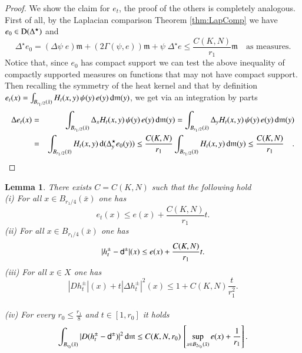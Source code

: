 \documentclass[11pt,reqno]{amsart}
\newcommand{\dom}{\rm D}
\newcommand{\mm}{\mathfrak m}
\newcommand{\sfd}{{\sf d}}
\renewcommand{\d}{{\rm{d}}}
\newtheorem{lemma}[theorem]{Lemma}
\theoremstyle{definition}
\theoremstyle{remark}
\theoremstyle{remark}
\theoremstyle{remark}
\theoremstyle{remark}
\theoremstyle{remark}
\theoremstyle{remark}
\theoremstyle{remark}
\begin{document}
\begin{proof}
We show the claim for $e_t$, the proof of the others is completely analogous. First of all,  by the Laplacian comparison Theorem  \ref{thm:LapComp} we have  $e_0\in \dom(\Delta^\star)$ and
$$\Delta^\star e_0= \left(\Delta \psi\; e \right) \mm+ \left( 2 \Gamma(\psi,e ) \right) \mm + \psi \; \Delta^\star e \leq \frac{C(K,N)}{r_{1}} \mm \quad\text{as measures}.$$
Notice that, since $e_0$ has compact support we can test the above inequality of compactly supported measures on functions that may not have compact support.  Then recalling the symmetry of the heat kernel and that by definition $e_t(x)=\int_{B_{r_{1}/2}(\bar{x})} H_t(x,y) \, \psi(y) \, e(y) \, \d\mm(y)$, we get via an integration by parts
\begin{eqnarray}
\Delta e_t (x) &=& \int_{B_{r_{1}/2}(\bar{x})} \Delta_x H_t(x,y) \, \psi(y) \, e(y) \, \d\mm(y) =  \int_{B_{r_{1}/2}(\bar{x})} \Delta_y H_t(x,y) \, \psi(y) \, e(y) \, \d\mm(y) \nonumber \\
&=&    \int_{B_{r_{1}/2}(\bar{x})} H_t(x,y) \,  \d (\Delta^\star_y  e_0 (y))  \leq    \frac{C(K,N)}{r_{1}}   \int_{B_{r_{1}/2}(\bar{x})} H_t(x,y) \,  \d \mm(y) \leq 
  \frac{C(K,N)}{r_{1}} \quad.  \nonumber
 \end{eqnarray}
\end{proof}

\begin{lemma}\label{lem:EstHtReg}
There exists $C=C(K,N)$ such that the following hold
\\(i) For all $x \in B_{r_{1}/4}(\bar{x})$ one has
\begin{equation}\label{eq:LinfEstet}
e_{t}(x) \leq  e(x) +  \frac{C(K,N)} {r_{1}} t.
\end{equation}
(ii) For all $x \in B_{r_{1}/4}(\bar{x})$ one has
\begin{equation}\label{eq:LinfEstht}
|h^{\pm}_{t}-\sfd^{\pm}|(x) \leq e(x)+ \frac{C(K,N)}{r_1} t.
\end{equation}
(iii) For all $x \in X$ one has
\begin{equation}
|D h^{\pm}_t|(x)+ t  |\Delta h^{\pm}_t |^2(x) \leq   1+ C(K,N) \frac{ t}{r_{1}^{2}}.
\end{equation}
\\(iv) For every $r_{0} \leq \frac{r_{1}}{8}$ and $t\in [1,r_{0}]$ it holds
\begin{equation}\label{eq:L2Esthd}
\int_{B_{r_{0}}(\bar{x})} |D(h^{\pm}_{t}-\sfd^{\pm})|^{2} \, \d\mm \leq C(K,N,r_{0}) \, \left[ \sup_{x \in B_{2 r_{0}}(\bar{x})} e(x) +  \frac{1}{r_1} \right].
\end{equation}

\end{lemma}
\end{document}
